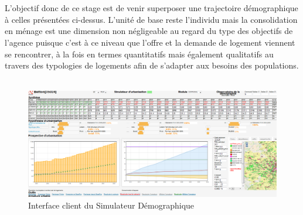 \documentclass{bredele}
\begin{document}
\\\\L’objectif donc de ce stage est de venir superposer une trajectoire démographique à celles présentées ci-dessus. L’unité de base reste l’individu mais la consolidation en ménage est une dimension non négligeable au regard du type des objectifs de l’agence puisque c’est à ce niveau que l’offre et la demande de logement viennent se rencontrer, à la fois en termes quantitatifs mais également qualitatifs au travers des typologies de logements afin de s’adapter aux besoins des populations.
\\\\
\begin{figure}\centering
\includegraphics[width=\textwidth]{VUEV5.png}
\caption{Interface client du Simulateur Démographique}
\begin{flushright}
\end{flushright}
\end{figure}
\clearpage
\end{document}
